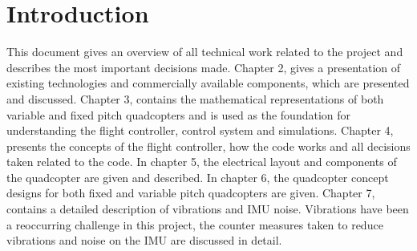 \section{Introduction}

This document gives an overview of all technical work related to the project and describes the most important decisions made. Chapter 2, gives a presentation of existing technologies and commercially available components, which are presented and discussed. Chapter 3, contains the mathematical representations of both variable and fixed pitch quadcopters and is used as the foundation for understanding the flight controller, control system and simulations. Chapter 4, presents the concepts of the flight controller, how the code works and all decisions taken related to the code. In chapter 5, the electrical layout and components of the quadcopter are given and described. In chapter 6, the quadcopter concept designs for both fixed and variable pitch quadcopters are given. Chapter 7, contains a detailed description of vibrations and IMU noise. Vibrations have been a reoccurring challenge in this project, the counter measures taken to reduce vibrations and noise on the IMU are discussed in detail.





